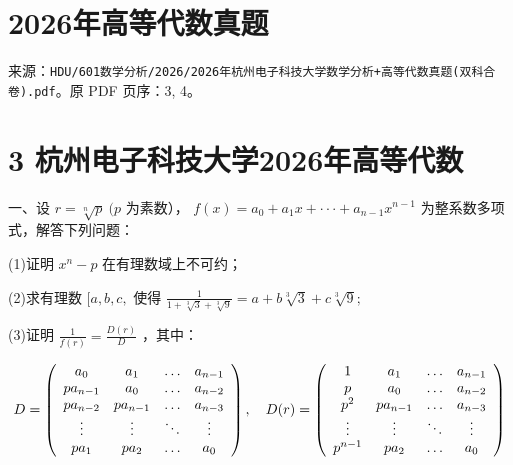 \documentclass[11pt,fontset=fandol]{ctexart}
\begin{document}
\section{2026年高等代数真题}\label{ux5e74ux9ad8ux7b49ux4ee3ux6570ux771fux9898}

来源：\texttt{HDU/601数学分析/2026/2026年杭州电子科技大学数学分析+高等代数真题(双科合卷).pdf}。原
PDF 页序：3, 4。

\section{3
杭州电子科技大学2026年高等代数}\label{ux676dux5ddeux7535ux5b50ux79d1ux6280ux5927ux5b662026ux5e74ux9ad8ux7b49ux4ee3ux6570}

一、设 \(r = \sqrt [ n ] { p } ~ ( p\) 为素数），
\(f ( x ) = a _ { 0 } + a _ { 1 } x + \cdot \cdot \cdot + a _ { n - 1 } x ^ { n - 1 }\)
为整系数多项式，解答下列问题：

(1)证明 \(x ^ { n } - p\) 在有理数域上不可约；

(2)求有理数 \([ a , b , c ,\) 使得
\({ \frac { 1 } { 1 + { \sqrt [ { 3 } ] { 3 } } + { \sqrt [ { 3 } ] { 9 } } } } = a + b { \sqrt [ { 3 } ] { 3 } } + c { \sqrt [ { 3 } ] { 9 } } ;\)

(3)证明 \({ \frac { 1 } { f ( r ) } } = { \frac { D ( r ) } { D } }\)
，其中：

\[
D = \left( \begin{array} { c c c c } { a _ { 0 } } & { a _ { 1 } } & { \ldots } & { a _ { n - 1 } } \\ { p a _ { n - 1 } } & { a _ { 0 } } & { \ldots } & { a _ { n - 2 } } \\ { p a _ { n - 2 } } & { p a _ { n - 1 } } & { \ldots } & { a _ { n - 3 } } \\ { \vdots } & { \vdots } & { \ddots } & { \vdots } \\ { p a _ { 1 } } & { p a _ { 2 } } & { \ldots } & { a _ { 0 } } \end{array} \right) , \quad D ( r ) = \left( \begin{array} { c c c c } { 1 } & { a _ { 1 } } & { \ldots } & { a _ { n - 1 } } \\ { p } & { a _ { 0 } } & { \ldots } & { a _ { n - 2 } } \\ { p ^ { 2 } } & { p a _ { n - 1 } } & { \ldots } & { a _ { n - 3 } } \\ { \vdots } & { \vdots } & { \ddots } & { \vdots } \\ { p ^ { n - 1 } } & { p a _ { 2 } } & { \ldots } & { a _ { 0 } } \end{array} \right)
\]
\end{document}
